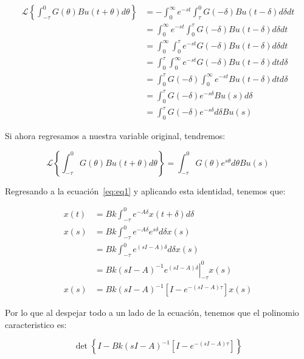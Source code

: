         \begin{align*}
            \mathcal{L} \left\{ \int_{-\tau}^0 G(\theta) B u(t + \theta) d\theta \right\} &= -\int_0^{\infty} e^{-st} \int_{\tau}^0 G(-\delta) B u(t - \delta) d\delta dt \\
            &= \int_0^{\infty} e^{-st} \int_0^{\tau} G(-\delta) B u(t - \delta) d\delta dt \\
            &= \int_0^{\infty} \int_0^{\tau} e^{-st} G(-\delta) B u(t - \delta) d\delta dt \\
            &= \int_0^{\tau} \int_0^{\infty} e^{-st} G(-\delta) B u(t - \delta) dt d\delta \\
            &= \int_0^{\tau} G(-\delta) \int_0^{\infty} e^{-st} B u(t - \delta) dt d\delta \\
            &= \int_0^{\tau} G(-\delta) e^{-s\delta} B u(s) d\delta \\
            &= \int_0^{\tau} G(-\delta) e^{-s\delta} d\delta B u(s)
        \end{align*}

        Si ahora regresamos a nuestra variable original, tendremos:

        \begin{equation}
            \mathcal{L} \left\{ \int_{-\tau}^0 G(\theta) B u(t + \theta) d\theta \right\} = \int_{-\tau}^0 G(\theta) e^{s\theta} d\theta B u(s)
        \end{equation}

        Regresando a la ecuación~\ref{eq:eq1} y aplicando esta identidad, tenemos que:

        \begin{align*}
            x(t) &= Bk \int_{-\tau}^0 e^{-A \delta} x(t + \delta) d\delta \\
            x(s) &= Bk \int_{-\tau}^0 e^{-A \delta} e^{s \delta} d\delta x(s) \\
            &= Bk \int_{-\tau}^0 e^{(sI-A) \delta} d\delta x(s) \\
            &= Bk \left.(sI - A)^{-1} e^{(sI-A) \delta} \right|_{-\tau}^0 x(s) \\
            x(s) &= Bk (sI - A)^{-1} \left[ I - e^{-(sI-A) \tau} \right] x(s)
        \end{align*}

        Por lo que al despejar todo a un lado de la ecuación, tenemos que el polinomio caracteristico es:

        \begin{equation}
            \det{\left\{ I - Bk (sI - A)^{-1} \left[ I - e^{-(sI-A) \tau} \right] \right\}}
        \end{equation}


